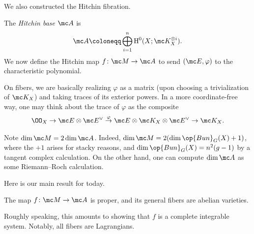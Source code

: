\documentclass{article}
\begin{document}
We also constructed the Hitchin fibration.
\begin{definition}
	The \textit{Hitchin base} $\mc A$ is
	\[\mc A\coloneqq\bigoplus_{i=1}^n\mathrm H^0(X;\mc K_X^{\otimes i}).\]
	We now define the Hitchin map $f\colon\mc M\to\mc A$ to send $(\mc E,\varphi)$ to the characteristic polynomial.
\end{definition}
\begin{remark}
	On fibers, we are basically realizing $\varphi$ as a matrix (upon choosing a trivialization of $\mc K_X$) and taking traces of its exterior powers. In a more coordinate-free way, one may think about the trace of $\varphi$ as the composite
	\[\OO_X\to\mc E\otimes\mc E^\lor\stackrel\varphi\to\mc E\otimes\mc K_X\otimes\mc E^\lor\to\mc K_X.\]
\end{remark}
\begin{remark}
	Note $\dim\mc M=2\dim\mc A$. Indeed, $\dim\mc M=2(\dim\op{Bun}_G(X)+1)$, where the $+1$ arises for stacky reasons, and $\dim\op{Bun}_G(X)=n^2(g-1)$ by a tangent complex calculation. On the other hand, one can compute $\dim\mc A$ as some Riemann--Roch calculation.
\end{remark}
Here is our main result for today.
\begin{theorem} \label{thm:hitchin}
	The map $f\colon\mc M\to\mc A$ is proper, and its general fibers are abelian varieties.
\end{theorem}
\begin{remark}
	Roughly speaking, this amounts to showing that $f$ is a complete integrable system. Notably, all fibers are Lagrangians.
\end{remark}
\end{document}
